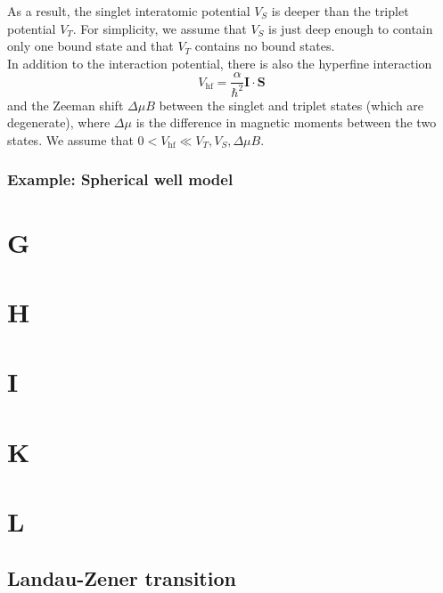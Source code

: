 \documentclass{book}
\theoremstyle{definition}
\newcommand{\al}{\alpha}
\newcommand{\f}[2]{\frac{#1}{#2}}
\begin{document}
As a result, the singlet interatomic potential $V_S$ is deeper than the triplet potential $V_T$. For simplicity, we assume that $V_S$ is just deep enough to contain only one bound state and that $V_T$ contains no bound states.\\


In addition to the interaction potential, there is also the hyperfine interaction
\begin{equation*}
V_\text{hf} = \f{\al}{\hbar^2} \mathbf{I}\cdot \mathbf{S}
\end{equation*}
and the Zeeman shift $\Delta \mu B$ between the singlet and triplet states (which are degenerate), where $\Delta \mu$ is the difference in magnetic moments between the two states. We assume that $0< V_\text{hf} \ll V_T,V_S,\Delta \mu B$. 


\subsection*{Example: Spherical well model}









\chapter*{G}
\chapter*{H}
\chapter*{I}
\chapter*{K}
\chapter*{L}


\section*{Landau-Zener transition}
\end{document}
